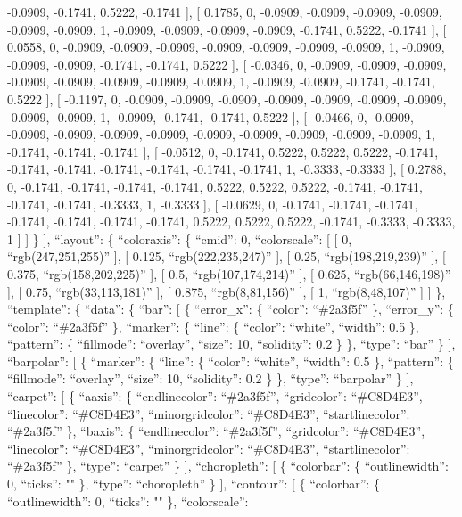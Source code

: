 \documentclass[
]{article}
\begin{document}
-0.0909, -0.1741, 0.5222, -0.1741 {]}, {[} 0.1785, 0, -0.0909, -0.0909,
-0.0909, -0.0909, -0.0909, -0.0909, 1, -0.0909, -0.0909, -0.0909,
-0.0909, -0.1741, 0.5222, -0.1741 {]}, {[} 0.0558, 0, -0.0909, -0.0909,
-0.0909, -0.0909, -0.0909, -0.0909, -0.0909, 1, -0.0909, -0.0909,
-0.0909, -0.1741, -0.1741, 0.5222 {]}, {[} -0.0346, 0, -0.0909, -0.0909,
-0.0909, -0.0909, -0.0909, -0.0909, -0.0909, -0.0909, 1, -0.0909,
-0.0909, -0.1741, -0.1741, 0.5222 {]}, {[} -0.1197, 0, -0.0909, -0.0909,
-0.0909, -0.0909, -0.0909, -0.0909, -0.0909, -0.0909, -0.0909, 1,
-0.0909, -0.1741, -0.1741, 0.5222 {]}, {[} -0.0466, 0, -0.0909, -0.0909,
-0.0909, -0.0909, -0.0909, -0.0909, -0.0909, -0.0909, -0.0909, -0.0909,
1, -0.1741, -0.1741, -0.1741 {]}, {[} -0.0512, 0, -0.1741, 0.5222,
0.5222, 0.5222, -0.1741, -0.1741, -0.1741, -0.1741, -0.1741, -0.1741,
-0.1741, 1, -0.3333, -0.3333 {]}, {[} 0.2788, 0, -0.1741, -0.1741,
-0.1741, -0.1741, 0.5222, 0.5222, 0.5222, -0.1741, -0.1741, -0.1741,
-0.1741, -0.3333, 1, -0.3333 {]}, {[} -0.0629, 0, -0.1741, -0.1741,
-0.1741, -0.1741, -0.1741, -0.1741, -0.1741, 0.5222, 0.5222, 0.5222,
-0.1741, -0.3333, -0.3333, 1 {]} {]} \} {]}, ``layout'': \{
``coloraxis'': \{ ``cmid'': 0, ``colorscale'': {[} {[} 0,
``rgb(247,251,255)'' {]}, {[} 0.125, ``rgb(222,235,247)'' {]}, {[} 0.25,
``rgb(198,219,239)'' {]}, {[} 0.375, ``rgb(158,202,225)'' {]}, {[} 0.5,
``rgb(107,174,214)'' {]}, {[} 0.625, ``rgb(66,146,198)'' {]}, {[} 0.75,
``rgb(33,113,181)'' {]}, {[} 0.875, ``rgb(8,81,156)'' {]}, {[} 1,
``rgb(8,48,107)'' {]} {]} \}, ``template'': \{ ``data'': \{ ``bar'': {[}
\{ ``error\_x'': \{ ``color'': ``\#2a3f5f'' \}, ``error\_y'': \{
``color'': ``\#2a3f5f'' \}, ``marker'': \{ ``line'': \{ ``color'':
``white'', ``width'': 0.5 \}, ``pattern'': \{ ``fillmode'': ``overlay'',
``size'': 10, ``solidity'': 0.2 \} \}, ``type'': ``bar'' \} {]},
``barpolar'': {[} \{ ``marker'': \{ ``line'': \{ ``color'': ``white'',
``width'': 0.5 \}, ``pattern'': \{ ``fillmode'': ``overlay'', ``size'':
10, ``solidity'': 0.2 \} \}, ``type'': ``barpolar'' \} {]}, ``carpet'':
{[} \{ ``aaxis'': \{ ``endlinecolor'': ``\#2a3f5f'', ``gridcolor'':
``\#C8D4E3'', ``linecolor'': ``\#C8D4E3'', ``minorgridcolor'':
``\#C8D4E3'', ``startlinecolor'': ``\#2a3f5f'' \}, ``baxis'': \{
``endlinecolor'': ``\#2a3f5f'', ``gridcolor'': ``\#C8D4E3'',
``linecolor'': ``\#C8D4E3'', ``minorgridcolor'': ``\#C8D4E3'',
``startlinecolor'': ``\#2a3f5f'' \}, ``type'': ``carpet'' \} {]},
``choropleth'': {[} \{ ``colorbar'': \{ ``outlinewidth'': 0, ``ticks'':
"" \}, ``type'': ``choropleth'' \} {]}, ``contour'': {[} \{
``colorbar'': \{ ``outlinewidth'': 0, ``ticks'': "" \}, ``colorscale'':
\end{document}
